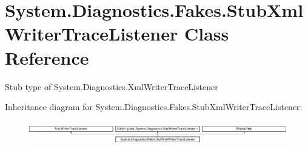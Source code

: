 \hypertarget{class_system_1_1_diagnostics_1_1_fakes_1_1_stub_xml_writer_trace_listener}{\section{System.\-Diagnostics.\-Fakes.\-Stub\-Xml\-Writer\-Trace\-Listener Class Reference}
\label{class_system_1_1_diagnostics_1_1_fakes_1_1_stub_xml_writer_trace_listener}
}


Stub type of System.\-Diagnostics.\-Xml\-Writer\-Trace\-Listener 


Inheritance diagram for System.\-Diagnostics.\-Fakes.\-Stub\-Xml\-Writer\-Trace\-Listener\-:\begin{figure}[H]
\begin{center}
\leavevmode
\includegraphics[height=1.048689cm]{class_system_1_1_diagnostics_1_1_fakes_1_1_stub_xml_writer_trace_listener}
\end{center}
\end{figure}
